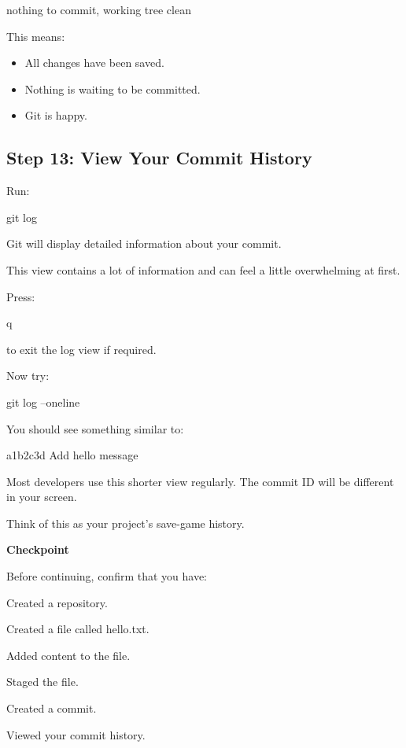 \documentclass{csc2059practical}
\begin{document}
\begin{terminalplain}
nothing to commit, working tree clean
\end{terminalplain}
This means:

\begin{itemize}
  \item All changes have been saved.
  \item Nothing is waiting to be committed.
  \item Git is happy.
\end{itemize}
\subsection{Step 13: View Your Commit History}
Run:

\begin{terminalplain}
git log
\end{terminalplain}
Git will display detailed information about your commit.

This view contains a lot of information and can feel a little overwhelming at first.

Press:

\begin{terminalplain}
q
\end{terminalplain}
to exit the log view if required.

Now try:

\begin{terminalplain}
git log --oneline
\end{terminalplain}
You should see something similar to:

\begin{terminalplain}
a1b2c3d Add hello message
\end{terminalplain}
Most developers use this shorter view regularly. The commit ID will be different in your screen.

Think of this as your project's save-game history.

\begin{reflectionbox}
\textbf{Checkpoint}\par
\medskip

Before continuing, confirm that you have:


Created a repository.


Created a file called hello.txt.


Added content to the file.


Staged the file.


Created a commit.


Viewed your commit history.


\end{reflectionbox}
\end{document}

